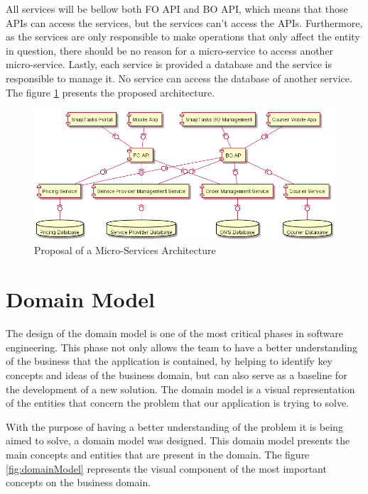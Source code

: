 \par
All services will be bellow both FO API and BO API, which means that those APIs can access the services, but the services can't access the APIs. Furthermore, as the services are only responsible to make operations that only affect the entity in question, there should be no reason for a micro-service to access another micro-service. Lastly, each service is provided a database and the service is responsible to manage it. No service can access the database of another service. The figure \ref{fig:microservicesProposal} presents the proposed architecture.
\par

\begin{figure}[ht]
\centering
\includegraphics[width=\textwidth,keepaspectratio]{chapters/Architectural_Overview/assets/MicroServices.png}
\caption[Proposal of a Micro-Services Architecture]{Proposal of a Micro-Services Architecture}
\label{fig:microservicesProposal}
\end{figure}


\section{Domain Model}
\label{sec:Implementation_DomainModel}
The design of the domain model is one of the most critical phases in software engineering. This phase not only allows the team to have a better understanding of the business that the application is contained, by helping to identify key concepts and ideas of the business domain, but can also serve as a baseline for the development of a new solution. The domain model is a visual representation of the entities that concern the problem that our application is trying to solve.

\par

With the purpose of having a better understanding of the problem it is being aimed to solve, a domain model was designed. This domain model presents the main concepts and entities that are present in the domain. The figure \ref{fig:domainModel} represents the visual component of the most important concepts on the business domain.



